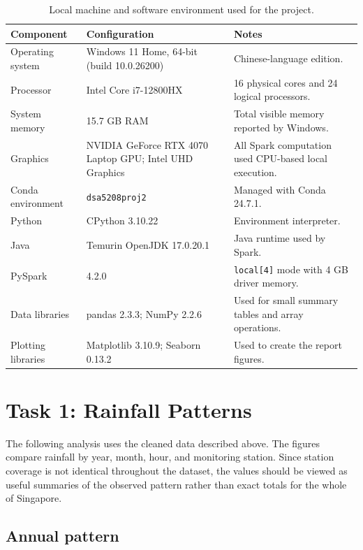 \documentclass[11pt]{article}
\begin{document}
\begin{table}[htbp]
    \centering
    \caption{Local machine and software environment used for the project.}
    \label{tab:runtime-configuration}
    \small
    \begin{tabularx}{\textwidth}{@{}p{}p{}X@{}}
        \toprule
        Component & Configuration & Notes \\
        \midrule
        Operating system & Windows 11 Home, 64-bit (build 10.0.26200) & Chinese-language edition. \\
        Processor & Intel Core i7-12800HX & 16 physical cores and 24 logical processors. \\
        System memory & 15.7 GB RAM & Total visible memory reported by Windows. \\
        Graphics & NVIDIA GeForce RTX 4070 Laptop GPU; Intel UHD Graphics & All Spark computation used CPU-based local execution. \\
        Conda environment & \texttt{dsa5208proj2} & Managed with Conda 24.7.1. \\
        Python & CPython 3.10.22 & Environment interpreter. \\
        Java & Temurin OpenJDK 17.0.20.1 & Java runtime used by Spark. \\
        PySpark & 4.2.0 & \texttt{local[4]} mode with 4 GB driver memory. \\
        Data libraries & pandas 2.3.3; NumPy 2.2.6 & Used for small summary tables and array operations. \\
        Plotting libraries & Matplotlib 3.10.9; Seaborn 0.13.2 & Used to create the report figures. \\
        \bottomrule
    \end{tabularx}
\end{table}

\section{Task 1: Rainfall Patterns}

The following analysis uses the cleaned data described above. The figures
compare rainfall by year, month, hour, and monitoring station. Since station
coverage is not identical throughout the dataset, the values should be viewed
as useful summaries of the observed pattern rather than exact totals for the
whole of Singapore.

\subsection{Annual pattern}
\end{document}
